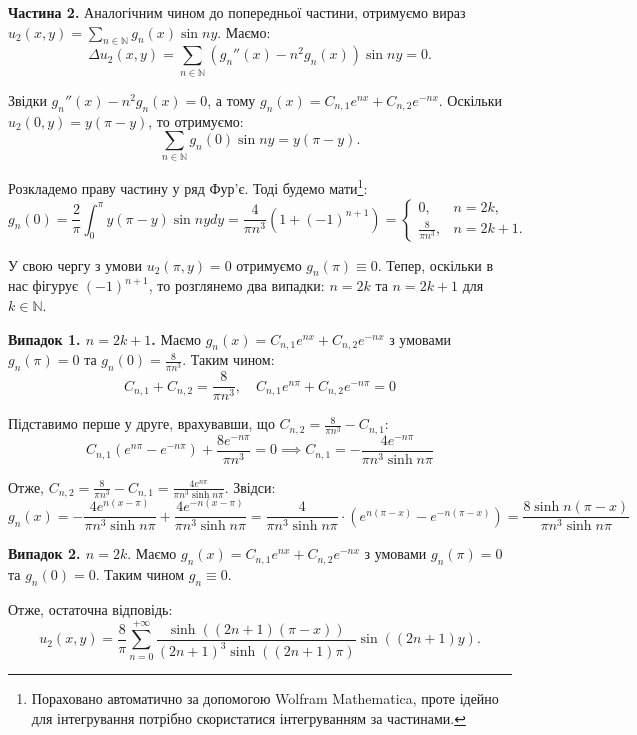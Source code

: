\documentclass{hw_template}
\begin{document}
\textbf{Частина 2.} Аналогічним чином до попередньої частини, отримуємо вираз
$u_2(x,y) = \sum_{n \in \mathbb{N}} g_n(x)\sin ny$. Маємо:
\begin{equation*}
    \Delta u_2(x,y) = \sum_{n \in \mathbb{N}} \left( g_n''(x) - n^2g_n(x) \right)\sin ny = 0.
\end{equation*}

Звідки $g_n''(x) - n^2g_n(x) = 0$, а тому $g_n(x) = C_{n,1}e^{nx} + C_{n,2}e^{-nx}$. Оскільки
$u_2(0,y) = y(\pi-y)$, то отримуємо:
\begin{equation*}
    \sum_{n \in \mathbb{N}} g_n(0)\sin ny = y(\pi - y). 
\end{equation*}

Розкладемо праву частину у ряд Фур'є. Тоді будемо мати\footnote{Пораховано автоматично за допомогою Wolfram Mathematica, проте ідейно для інтегрування потрібно 
скористатися інтегруванням за частинами.}:
\begin{equation*}
    g_n(0) = \frac{2}{\pi}\int_0^{\pi} y(\pi-y)\sin ny dy = \frac{4}{\pi n^3}(1+(-1)^{n+1}) = \begin{cases}
        0, & n=2k, \\
        \frac{8}{\pi n^3}, & n=2k+1.
    \end{cases}
\end{equation*}

У свою чергу з умови $u_2(\pi,y)=0$ отримуємо $g_n(\pi)\equiv 0$. Тепер, оскільки в нас фігурує $(-1)^{n+1}$, 
то розглянемо два випадки: $n=2k$ та $n=2k+1$ для $k \in \mathbb{N}$.

\textbf{Випадок 1. $n=2k+1$.} Маємо $g_n(x) = C_{n,1}e^{nx} + C_{n,2}e^{-nx}$ з умовами $g_n(\pi)=0$
та $g_n(0) = \frac{8}{\pi n^3}$. Таким чином:
\begin{equation*}
    C_{n,1} + C_{n,2} = \frac{8}{\pi n^3}, \quad C_{n,1}e^{n\pi} + C_{n,2}e^{-n\pi} = 0
\end{equation*}

Підставимо перше у друге, врахувавши, що $C_{n,2} = \frac{8}{\pi n^3}-C_{n,1}$:
\begin{equation*}
    C_{n,1}(e^{n\pi}-e^{-n\pi}) + \frac{8e^{-n\pi}}{\pi n^3} = 0 \implies C_{n,1} = -\frac{4e^{-n\pi}}{\pi n^3 \sinh n\pi}
\end{equation*}

Отже, $C_{n,2} = \frac{8}{\pi n^3}-C_{n,1} = \frac{4e^{n\pi}}{\pi n^3 \sinh n\pi}$. Звідси:
\begin{equation*}
    g_n(x) = -\frac{4e^{n(x-\pi)}}{\pi n^3 \sinh n\pi} + \frac{4e^{-n(x-\pi)}}{\pi n^3 \sinh n\pi} = \frac{4}{\pi n^3 \sinh n\pi} \cdot (e^{n(\pi-x)} - e^{-n(\pi-x)}) = \frac{8\sinh n(\pi-x)}{\pi n^3 \sinh n\pi}
\end{equation*}

\textbf{Випадок 2. $n=2k$}. Маємо $g_n(x) = C_{n,1}e^{nx} + C_{n,2}e^{-nx}$ з умовами $g_n(\pi)=0$
та $g_n(0) = 0$. Таким чином $g_n \equiv 0$.

Отже, остаточна відповідь:
\begin{equation*}
    \boxed{u_2(x,y) = \frac{8}{\pi}\sum_{n=0}^{+\infty} \frac{\sinh ((2n+1)(\pi-x))}{(2n+1)^3 \sinh ((2n+1)\pi)} \sin ((2n+1)y).}
\end{equation*}
\end{document}
